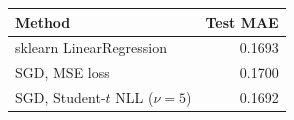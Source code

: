 \begin{tabular}{lr}
\toprule
Method & Test MAE \\
\midrule
sklearn LinearRegression & 0.1693 \\
SGD, MSE loss & 0.1700 \\
SGD, Student-$t$ NLL ($\nu=5$) & 0.1692 \\
\bottomrule
\end{tabular}
